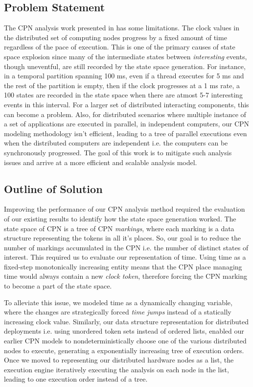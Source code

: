 \subsection{Problem Statement}

The CPN analysis work presented in \cite{kumar2014colored} has some limitations. The clock values in the distributed set of computing nodes progress by a fixed amount of time regardless of the pace of execution. This is one of the primary causes of state space explosion since many of the intermediate states between \emph{interesting} events, though uneventful, are still recorded by the state space generation. For instance, in a temporal partition spanning 100 ms, even if a thread executes for 5 ms and the rest of the partition is empty, then if the clock progresses at a 1 ms rate, a 100 states are recorded in the state space when there are atmost 5-7 interesting events in this interval. For a larger set of distributed interacting components, this can become a problem. Also, for distributed scenarios where multiple instance of a set of applications are executed in parallel, in independent computers, our CPN modeling methodology isn't efficient, leading to a tree of parallel executions even when the distributed computers are independent i.e. the computers can be synchronously progressed. The goal of this work is to mitigate such analysis issues and arrive at a more efficient and scalable analysis model. 

\subsection{Outline of Solution}
Improving the performance of our CPN analysis method required the evaluation of our existing results to identify how the state space generation worked. The state space of CPN is a tree of CPN \emph{markings}, where each marking is a data structure representing the tokens in all it's places. So, our goal is to reduce the number of markings accumulated in the CPN i.e. the number of distinct states of interest. This required us to evaluate our representation of time. Using time as a fixed-step monotonically increasing entity means that the CPN place managing time would always contain a new \emph{clock token}, therefore forcing the CPN marking to become a part of the state space.

To alleviate this issue, we modeled time as a dynamically changing variable, where the changes are strategically forced \emph{time jumps} instead of a statically increasing clock value. Similarly, our data structure representation for distributed deployments i.e. using unordered token sets instead of ordered lists, enabled our earlier CPN models to nondeterministically choose one of the various distributed nodes to execute, generating a exponentially increasing tree of execution orders. Once we moved to representing our distributed hardware nodes as a list, the execution engine iteratively executing the analysis on each node in the list, leading to one execution order instead of a tree. 

